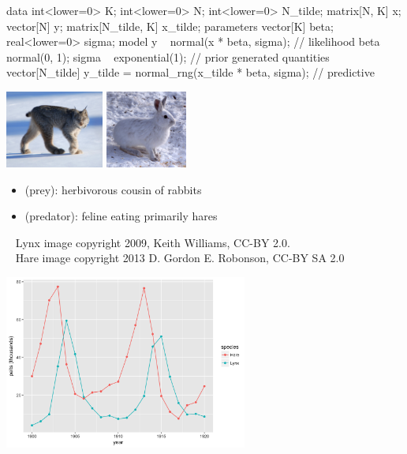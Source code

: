 \documentclass[10pt]{report}
\begin{document}
%
\begin{stancode}
data {
  int<lower=0> K;   int<lower=0> N;    int<lower=0> N_tilde; 
  matrix[N, K] x;   vector[N] y;       matrix[N_tilde, K] x_tilde;
}
parameters {
  vector[K] beta;   real<lower=0> sigma;
}
model {
  y ~ normal(x * beta, sigma);                           // likelihood
  beta ~ normal(0, 1);          sigma ~ exponential(1);  // prior
}
generated quantities {
  vector[N_tilde] y_tilde = normal_rng(x_tilde * beta, sigma);  // predictive
}
\end{stancode}

%
\begin{center}
\includegraphics[height=1in]{img/lynx.jpg}
\hspace*{0.25in}
\includegraphics[height=1in]{img/hare.jpg}
\end{center}
\begin{itemize}
\item {} (prey): herbivorous cousin of rabbits
\item {} (predator): feline eating primarily hares
\end{itemize}
\vfill
{\tiny
\mbox{ } \hfill
Lynx image copyright 2009, Keith Williams, CC-BY 2.0.
\\[-2pt]
\mbox{ } \hfill
Hare image copyright 2013 D. Gordon E. Robonson, CC-BY SA 2.0}


%
\vspace*{6pt}
\begin{center}
\includegraphics[width=0.6\textwidth]{img/hare-lynx-pelts-1.png}
\end{center}
\end{document}
